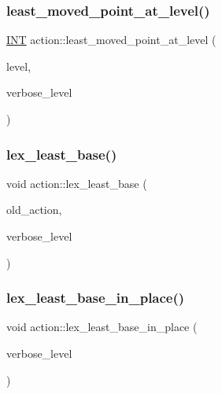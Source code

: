 \mbox{\label{classaction_ade162671419b094bb4af3cf4bd59c4e2}} 
\subsubsection{\texorpdfstring{least\+\_\+moved\+\_\+point\+\_\+at\+\_\+level()}{least\_moved\_point\_at\_level()}}
{\footnotesize\ttfamily \mbox{\hyperlink{galois_8h_a09fddde158a3a20bd2dcadb609de11dc}{I\+NT}} action\+::least\+\_\+moved\+\_\+point\+\_\+at\+\_\+level (\begin{DoxyParamCaption}\item[{\mbox{\hyperlink{galois_8h_a09fddde158a3a20bd2dcadb609de11dc}{I\+NT}}}]{level,  }\item[{\mbox{\hyperlink{galois_8h_a09fddde158a3a20bd2dcadb609de11dc}{I\+NT}}}]{verbose\+\_\+level }\end{DoxyParamCaption})}

\mbox{\label{classaction_a9a2ef76acebb468140a74f3a6af8eb88}} 
\subsubsection{\texorpdfstring{lex\+\_\+least\+\_\+base()}{lex\_least\_base()}}
{\footnotesize\ttfamily void action\+::lex\+\_\+least\+\_\+base (\begin{DoxyParamCaption}\item[{\mbox{\hyperlink{classaction}{action}} $\ast$}]{old\+\_\+action,  }\item[{\mbox{\hyperlink{galois_8h_a09fddde158a3a20bd2dcadb609de11dc}{I\+NT}}}]{verbose\+\_\+level }\end{DoxyParamCaption})}

\mbox{\label{classaction_a24c460a91daf89ab1994a4160623ccb4}} 
\subsubsection{\texorpdfstring{lex\+\_\+least\+\_\+base\+\_\+in\+\_\+place()}{lex\_least\_base\_in\_place()}}
{\footnotesize\ttfamily void action\+::lex\+\_\+least\+\_\+base\+\_\+in\+\_\+place (\begin{DoxyParamCaption}\item[{\mbox{\hyperlink{galois_8h_a09fddde158a3a20bd2dcadb609de11dc}{I\+NT}}}]{verbose\+\_\+level }\end{DoxyParamCaption})}

